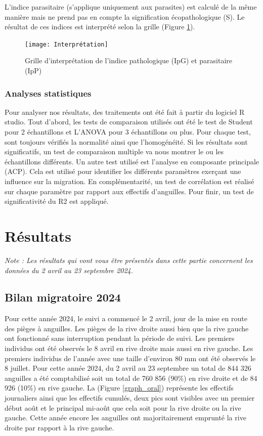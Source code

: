 \documentclass[11pt,titlepage,twoside]{article}\usepackage[]{graphicx}\usepackage[table]{xcolor}
\begin{document}
L’indice parasitaire (s’applique uniquement aux parasites) est calculé de la même manière mais ne prend pas en compte la signification écopathologique (S). Le résultat de ces indices est interprété selon la grille (Figure \ref{Interprétation}).

\begin{figure}[htpb]
\centering
\texttt{[image: Interprétation]}
\caption{Grille d'interprétation de l'indice pathologique (IpG) et parasitaire (IpP) \citep{elie_sante_2014}}
\label{Interprétation}
\end{figure}

\subsubsection{Analyses statistiques}
	
Pour analyser nos résultats, des traitements ont été fait à partir du logiciel R studio.
Tout d’abord, les tests de comparaison utilisés ont été le test de Student pour 2 échantillons et L’ANOVA pour 3 échantillons ou plus. Pour chaque test, sont toujours vérifiés la normalité ainsi que l’homogénéité. Si les résultats sont significatifs, un test de comparaison multiple va nous montrer le ou les échantillons différents.
Un autre test utilisé est l’analyse en composante principale (ACP). Cela est utilisé pour identifier les différents paramètres exerçant une influence sur la migration. En complémentarité, un test de corrélation est réalisé sur chaque paramètre par rapport aux effectifs d’anguilles. Pour finir, un test de significativité du R2 est appliqué.


\section{Résultats}

\textit{Note : Les résultats qui vont vous être présentés dans cette partie concernent les données du 2 avril au 23 septembre 2024.}

\subsection{Bilan migratoire 2024 }

Pour cette année 2024, le suivi a commencé le 2 avril, jour de la mise en route des pièges à anguilles. Les pièges de la rive droite aussi bien que la rive gauche ont fonctionné sans interruption pendant la période de suivi. Les premiers individus ont été observés le 8 avril en rive droite mais aussi en rive gauche. Les premiers individus de l’année avec une taille d’environ 80 mm ont été observés le 8 juillet. Pour cette année 2024, du 2 avril au 23 septembre un total de 844 326 anguilles a été comptabilisé soit un total de 760 856 (90\%) en rive droite et de 84 926 (10\%) en rive gauche. La (Figure \ref{graph_oral}) représente les effectifs journaliers ainsi que les effectifs cumulés, deux pics sont visibles avec un premier début août et le principal mi-août que cela soit pour la rive droite ou la rive gauche. Cette année encore les anguilles ont majoritairement emprunté la rive droite par rapport à la rive gauche.
\end{document}
